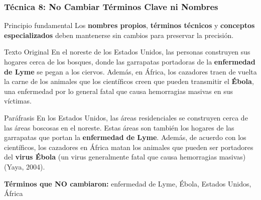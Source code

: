 \documentclass[aspectratio=169]{beamer}
\begin{document}
\begin{frame}
	\frametitle{Técnica 8: No Cambiar Términos Clave ni Nombres}
	
	\begin{alertblock}{Principio fundamental}
		Los \textbf{nombres propios}, \textbf{términos técnicos} y \textbf{conceptos especializados} deben mantenerse sin cambios para preservar la precisión.
	\end{alertblock}
	
	\vspace{0.5em}
	
	\begin{exampleblock}{Texto Original}
		\tiny
		En el noreste de los Estados Unidos, las personas construyen sus hogares cerca de los bosques, donde las garrapatas portadoras de la \textbf{enfermedad de Lyme} se pegan a los ciervos. Además, en África, los cazadores traen de vuelta la carne de los animales que los científicos creen que pueden transmitir el \textbf{Ébola}, una enfermedad por lo general fatal que causa hemorragias masivas en sus víctimas.
	\end{exampleblock}
	
	\vspace{0.3em}
	
	\begin{exampleblock}{Paráfrasis}
		\tiny
		En los Estados Unidos, las áreas residenciales se construyen cerca de las áreas boscosas en el noreste. Estas áreas son también los hogares de las garrapatas que portan la \textbf{enfermedad de Lyme}. Además, de acuerdo con los científicos, los cazadores en África matan los animales que pueden ser portadores del \textbf{virus Ébola} (un virus generalmente fatal que causa hemorragias masivas) (Yaya, 2004).
	\end{exampleblock}
	
	\vspace{0.3em}
	
	\textbf{Términos que NO cambiaron:} enfermedad de Lyme, Ébola, Estados Unidos, África
\end{frame}

\end{document}
